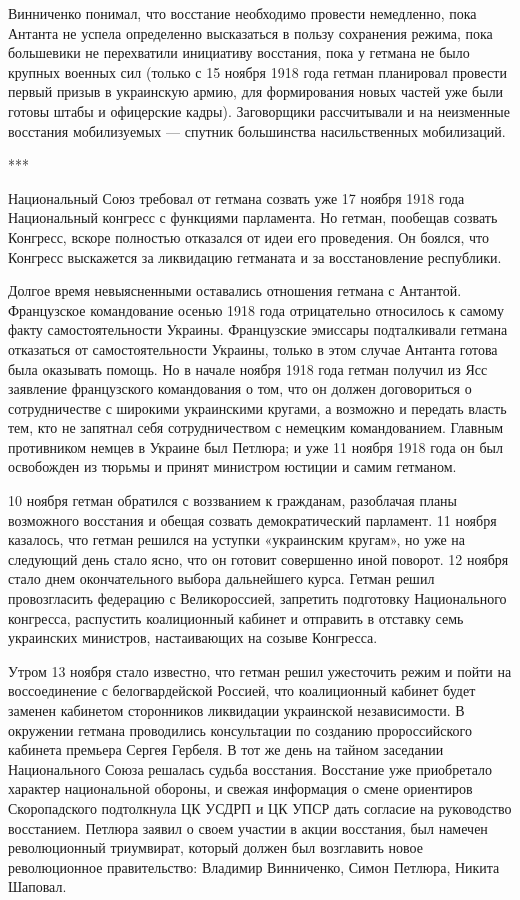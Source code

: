\begin{itemize}
Винниченко понимал, что восстание необходимо провести немедленно, пока Антанта
не успела определенно высказаться в пользу сохранения режима, пока большевики
не перехватили инициативу восстания, пока у гетмана не было крупных военных сил
(только с 15 ноября 1918 года гетман планировал провести первый призыв в
украинскую армию, для формирования новых частей уже были готовы штабы и
офицерские кадры). Заговорщики рассчитывали и на неизменные восстания
мобилизуемых — спутник большинства насильственных мобилизаций.

***

Национальный Союз требовал от гетмана созвать уже 17 ноября 1918 года
Национальный конгресс с функциями парламента. Но гетман, пообещав созвать
Конгресс, вскоре полностью отказался от идеи его проведения. Он боялся, что
Конгресс выскажется за ликвидацию гетманата и за восстановление республики.

Долгое время невыясненными оставались отношения гетмана с Антантой. Французское
командование осенью 1918 года отрицательно относилось к самому факту
самостоятельности Украины. Французские эмиссары подталкивали гетмана отказаться
от самостоятельности Украины, только в этом случае Антанта готова была
оказывать помощь. Но в начале ноября 1918 года гетман получил из Ясс заявление
французского командования о том, что он должен договориться о сотрудничестве с
широкими украинскими кругами, а возможно и передать власть тем, кто не запятнал
себя сотрудничеством с немецким командованием. Главным противником немцев в
Украине был Петлюра; и уже 11 ноября 1918 года он был освобожден из тюрьмы и
принят министром юстиции и самим гетманом.

10 ноября гетман обратился с воззванием к гражданам, разоблачая планы
возможного восстания и обещая созвать демократический парламент. 11 ноября
казалось, что гетман решился на уступки «украинским кругам», но уже на
следующий день стало ясно, что он готовит совершенно иной поворот. 12 ноября
стало днем окончательного выбора дальнейшего курса. Гетман решил провозгласить
федерацию с Великороссией, запретить подготовку Национального конгресса,
распустить коалиционный кабинет и отправить в отставку семь украинских
министров, настаивающих на созыве Конгресса.

Утром 13 ноября стало известно, что гетман решил ужесточить режим и пойти на
воссоединение с белогвардейской Россией, что коалиционный кабинет будет заменен
кабинетом сторонников ликвидации украинской независимости. В окружении гетмана
проводились консультации по созданию пророссийского кабинета премьера Сергея
Гербеля. В тот же день на тайном заседании Национального Союза решалась судьба
восстания. Восстание уже приобретало характер национальной обороны, и свежая
информация о смене ориентиров Скоропадского подтолкнула ЦК УСДРП и ЦК УПСР дать
согласие на руководство восстанием. Петлюра заявил о своем участии в акции
восстания, был намечен революционный триумвират, который должен был возглавить
новое революционное правительство: Владимир Винниченко, Симон Петлюра, Никита
Шаповал.


\end{itemize}
